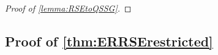 \begin{proof}[Proof of \cref{lemma:RSEtoQSSG}]
\end{proof}


\subsection{Proof of \cref{thm:ERRSErestricted}}\label{app:ERRSErestricted}


